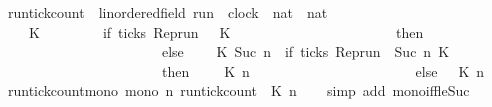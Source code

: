 \begin{isabellebody}
\begin{isamarkuptext}
\end{isamarkuptext}\isamarkuptrue%
\isamarkupfalse%
\ run{\isacharunderscore}tick{\isacharunderscore}count\ {\isacharcolon}{\isacharcolon}\ {\isacartoucheopen}{\isacharparenleft}{\isacharprime}{\isasymtau}{\isacharcolon}{\isacharcolon}linordered{\isacharunderscore}field{\isacharparenright}\ run\ {\isasymRightarrow}\ clock\ {\isasymRightarrow}\ nat\ {\isasymRightarrow}\ nat{\isacartoucheclose}\isanewline
\ \ {\isacharparenleft}{\isacartoucheopen}{\isacharhash}\isactrlsub {\isasymle}\ {\isacharunderscore}\ {\isacharunderscore}\ {\isacharunderscore}{\isacartoucheclose}{\isacharparenright}\isanewline
{}\isanewline
\ \ {\isacartoucheopen}{\isacharparenleft}{\isacharhash}\isactrlsub {\isasymle}\ {\isasymrho}\ K\ {}{\isacharparenright}\ \ \ \ \ \ \ {\isacharequal}\ {\isacharparenleft}if\ ticks\ {\isacharparenleft}{\isacharparenleft}Rep{\isacharunderscore}run\ {\isasymrho}{\isacharparenright}\ {}\ K{\isacharparenright}\isanewline
\ \ \ \ \ \ \ \ \ \ \ \ \ \ \ \ \ \ \ \ \ \ \ then\ {}\isanewline
\ \ \ \ \ \ \ \ \ \ \ \ \ \ \ \ \ \ \ \ \ \ \ else\ {}{\isacharparenright}{\isacartoucheclose}\isanewline
{\isacharbar}\ {\isacartoucheopen}{\isacharparenleft}{\isacharhash}\isactrlsub {\isasymle}\ {\isasymrho}\ K\ {\isacharparenleft}Suc\ n{\isacharparenright}{\isacharparenright}\ {\isacharequal}\ {\isacharparenleft}if\ ticks\ {\isacharparenleft}{\isacharparenleft}Rep{\isacharunderscore}run\ {\isasymrho}{\isacharparenright}\ {\isacharparenleft}Suc\ n{\isacharparenright}\ K{\isacharparenright}\isanewline
\ \ \ \ \ \ \ \ \ \ \ \ \ \ \ \ \ \ \ \ \ \ \ then\ {}\ {\isacharplus}\ {\isacharparenleft}{\isacharhash}\isactrlsub {\isasymle}\ {\isasymrho}\ K\ n{\isacharparenright}\isanewline
\ \ \ \ \ \ \ \ \ \ \ \ \ \ \ \ \ \ \ \ \ \ \ else\ {\isacharparenleft}{\isacharhash}\isactrlsub {\isasymle}\ {\isasymrho}\ K\ n{\isacharparenright}{\isacharparenright}{\isacartoucheclose}\isanewline
\isanewline
{}\isamarkupfalse%
\ run{\isacharunderscore}tick{\isacharunderscore}count{\isacharunderscore}mono{\isacharcolon}\ {\isacartoucheopen}mono\ {\isacharparenleft}{\isasymlambda}n{\isachardot}\ run{\isacharunderscore}tick{\isacharunderscore}count\ {\isasymrho}\ K\ n{\isacharparenright}{\isacartoucheclose}\isanewline
%
\isadelimproof
\ \ %
\endisadelimproof
%
\isatagproof
{}\isamarkupfalse%
\ {\isacharparenleft}simp\ add{\isacharcolon}\ mono{\isacharunderscore}iff{\isacharunderscore}le{\isacharunderscore}Suc{\isacharparenright}%
\endisatagproof

\end{isabellebody}
